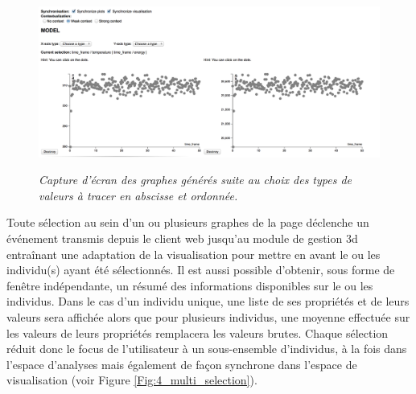 \begin{figure}[!htb]
  \centering
  {\includegraphics[width=0.9\linewidth,frame]{./figures/ch5/3_graph_display}}
    \caption[Graphes analytiques obtenus à partir de la base de données RDF.]{{\it Capture d'écran des graphes générés suite au choix des types de valeurs à tracer en abscisse et ordonnée.}}
  \label{Fig:3_graph_display}
\end{figure}

Toute sélection au sein d'un ou plusieurs graphes de la page déclenche un événement transmis depuis le client web jusqu'au module de gestion 3d entraînant une adaptation de la visualisation pour mettre en avant le ou les individu(s) ayant été sélectionnés. Il est aussi possible d'obtenir, sous forme de fenêtre indépendante, un résumé des informations disponibles sur le ou les individus. Dans le cas d'un individu unique, une liste de ses propriétés et de leurs valeurs sera affichée alors que pour plusieurs individus, une moyenne effectuée sur les valeurs de leurs propriétés remplacera les valeurs brutes.
Chaque sélection réduit donc le focus de l'utilisateur à un sous-ensemble d'individus, à la fois dans l'espace d'analyses mais également de façon synchrone dans l'espace de visualisation (voir Figure \ref{Fig:4_multi_selection}). 

